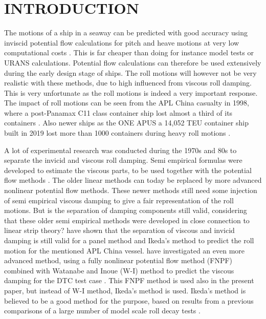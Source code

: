 \section*{INTRODUCTION}\label{introduction}

The motions of a ship in a seaway can be predicted with good accuracy
using inviscid potential flow calculations for pitch and heave motions
at very low computational costs \citep{7505983/FB64RGPF}. This is far
cheaper than doing for instance model tests or URANS calculations.
Potential flow calculations can therefore be used extensively during the
early design stage of ships. The roll motions will however not be very
realistic with these methods, due to high influenced from viscous roll
damping. This is very unfortunate as the roll motions is indeed a very
important response. The impact of roll motions can be seen from the APL
China casualty in 1998, where a post-Panamax C11 class container ship
lost almost a third of its containers \citep{7505983/WPADAQB3}. Also
newer ships as the ONE APUS a 14,052 TEU container ship built in 2019
lost more than 1000 containers during heavy roll motions
\citep{7505983/EYV6YF92}.

A lot of experimental research was conducted during the 1970s and 80s to
separate the invicid and viscous roll damping. Semi empirical formulas
were developed to estimate the viscous parts, to be used together with
the potential flow methods \citep{7505983/937PN5DT}. The older linear
methods can today be replaced by more advanced nonlinear potential flow
methods. These newer methods still need some injection of semi empirical
viscous damping to give a fair representation of the roll motions. But
is the separation of damping components still valid, considering that
these older semi empirical methods were developed in close connection to
linear strip theory? \citep{7505983/UGK6YEVD} have shown that the
separation of viscous and invicid damping is still valid for a panel
method and Ikeda's method to predict the roll motion for the mentioned
APL China vessel. \citep{7505983/24TNAV5Z} have investigated an even more
advanced method, using a fully nonlinear potential flow method (FNPF)
\citep{7505983/P4XDUMMQ} combined with Watanabe and Inoue (W-I) method
\citep{7505983/ARMIRMVY} to predict the viscous damping for the DTC test
case \citep{7505983/BYNJ8CFG}. This FNPF method is used also in the
present paper, but instead of W-I method, Ikeda's method is used.
Ikeda's method is believed to be a good method for the purpose, based on
results from a previous comparisons of a large number of model scale
roll decay tests \citep{7505983/QMGQ76Q9}.

